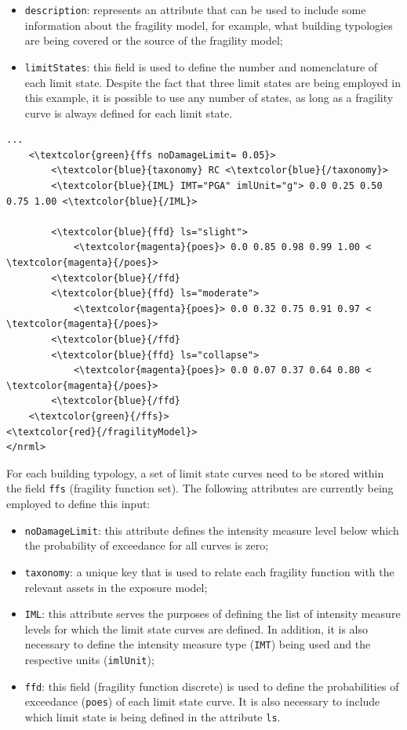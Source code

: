 \begin{itemize}
\item  \Verb+description+: represents an attribute that can be used to include  some information about the \gls{fragility model}, for example, what building typologies are being covered or the source of the \gls{fragility model};
\item  \Verb+limitStates+: this field is used to define the number and nomenclature of each limit state. Despite the fact that three limit states are being employed in this example, it is possible to use any number of states, as long as a fragility curve is always defined for each limit state.
\end{itemize}

\begin{Verbatim}[frame=single, commandchars=\\\{\}, samepage=true]
    ...
    <\textcolor{green}{ffs noDamageLimit= 0.05}>
        <\textcolor{blue}{taxonomy} RC <\textcolor{blue}{/taxonomy}>
        <\textcolor{blue}{IML} IMT="PGA" imlUnit="g"> 0.0 0.25 0.50 0.75 1.00 <\textcolor{blue}{/IML}>

        <\textcolor{blue}{ffd} ls="slight">
            <\textcolor{magenta}{poes}> 0.0 0.85 0.98 0.99 1.00 < \textcolor{magenta}{/poes}>
        <\textcolor{blue}{/ffd}
        <\textcolor{blue}{ffd} ls="moderate">
            <\textcolor{magenta}{poes}> 0.0 0.32 0.75 0.91 0.97 < \textcolor{magenta}{/poes}>
        <\textcolor{blue}{/ffd}
        <\textcolor{blue}{ffd} ls="collapse">
            <\textcolor{magenta}{poes}> 0.0 0.07 0.37 0.64 0.80 < \textcolor{magenta}{/poes}>
        <\textcolor{blue}{/ffd}
    <\textcolor{green}{/ffs}>
<\textcolor{red}{/fragilityModel}>
</nrml>
\end{Verbatim}

For each building typology, a set of limit state curves need to be stored within the field \Verb+ffs+ (fragility function set). The following attributes are currently being employed to define this input:

\begin{itemize}
\item  \Verb+noDamageLimit+: this attribute defines the intensity measure level below which the probability of exceedance for all curves is zero;
\item  \Verb+taxonomy+: a unique key that is used to relate each \gls{fragility function} with the relevant \glspl{asset} in the \gls{exposure model};
\item  \Verb+IML+: this attribute serves the purposes of defining the list of intensity measure levels for which the limit state curves are defined. In addition, it is also necessary to define the intensity measure type (\Verb+IMT+) being used and the respective units (\Verb+imlUnit+);
\item  \Verb+ffd+: this field (fragility function discrete) is used to define the probabilities of exceedance (\Verb+poes+) of each limit state curve. It is also necessary to include which limit state is being defined in the attribute \Verb+ls+.
\end{itemize}

